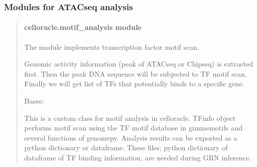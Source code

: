 \documentclass[letterpaper,10pt,english]{sphinxmanual}
\begin{document}
\subsubsection{Modules for ATAC\sphinxhyphen{}seq analysis}
\label{\detokenize{modules/celloracle:modules-for-atac-seq-analysis}}\begin{quote}


\paragraph{celloracle.motif\_analysis module}
\label{\detokenize{modules/celloracle.motif_analysis:module-celloracle.motif_analysis}}\label{\detokenize{modules/celloracle.motif_analysis:celloracle-motif-analysis-module}}\label{\detokenize{modules/celloracle.motif_analysis::doc}}
The {\hyperref[\detokenize{modules/celloracle.motif_analysis:module-celloracle.motif_analysis}]{}} module implements transcription factor motif scan.

Genomic activity information (peak of ATAC\sphinxhyphen{}seq or Chip\sphinxhyphen{}seq) is extracted first.
Then the peak DNA sequence will be subjected to TF motif scan.
Finally we will get list of TFs that potentially binds to a specific gene.

\begin{fulllineitems}
\label{\detokenize{modules/celloracle.motif_analysis:celloracle.motif_analysis.TFinfo}}
Bases: 

This is a custom class for motif analysis in celloracle.
TFinfo object performs motif scan using the TF motif database in gimmemotifs and several functions of genomepy.
Analysis results can be exported as a python dictionary or dataframe.
These files; python dictionary of dataframe of TF binding information, are needed during GRN inference.


\end{fulllineitems}
\end{quote}
\end{document}
